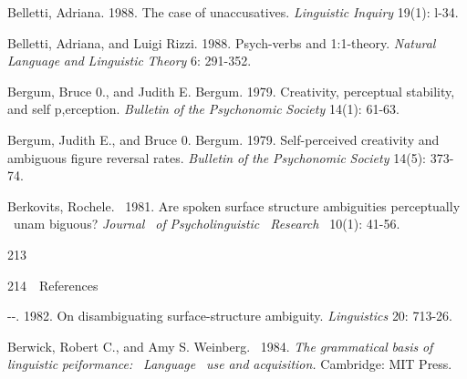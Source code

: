 \begin{styleStandard}
Belletti, Adriana. 1988. The case of unaccusatives. \textit{Linguistic}\textit{ }\textit{Inquiry}\textit{ }19(1): l{}-34.
\end{styleStandard}


\begin{styleStandard}
Belletti, Adriana, and Luigi Rizzi. 1988. Psych-verbs and 1:1-theory. \textit{Natural}\textit{ }\textit{Language}\textit{ }\textit{and}\textit{ }\textit{Linguistic}\textit{ }\textit{Theory}\textit{ }6: 291-352.
\end{styleStandard}


\begin{styleStandard}
Bergum, Bruce 0., and Judith E. Bergum. 1979. Creativity, perceptual stability, and self\- p,erception. \textit{Bulletin}\textit{ }\textit{of}\textit{ }\textit{the}\textit{ }\textit{Psychonomic}\textit{ }\textit{Society}\textit{ }14(1): 61-63.
\end{styleStandard}


\begin{styleStandard}
Bergum, Judith E., and Bruce 0. Bergum. 1979. Self-perceived creativity and ambiguous figure reversal rates. \textit{Bulletin}\textit{ }\textit{of}\textit{ }\textit{the}\textit{ }\textit{Psychonomic}\textit{ }\textit{Society}\textit{ }14(5): 373-74.
\end{styleStandard}


\begin{styleStandard}
Berkovits, Rochele. \ 1981. Are spoken surface structure ambiguities perceptually \ unam\- biguous? \textit{Journal }\textit{\ }\textit{of}\textit{ }\textit{Psycholinguistic }\textit{\ }\textit{Research }\textit{\ }10(1): 41-56.
\end{styleStandard}


\begin{styleStandard}
213
\end{styleStandard}


\clearpage\setcounter{page}{1}\begin{styleStandard}
214\ \ References
\end{styleStandard}


\begin{listWWNumxiileveli}
\item 
\begin{styleStandard}
{}-{}-. 1982. On disambiguating surface-structure ambiguity. \textit{Linguistics}\textit{ }20: 713-26.
\end{styleStandard}


\end{listWWNumxiileveli}
\begin{styleStandard}
Berwick, Robert C., and Amy S. Weinberg. \ 1984. \textit{The}\textit{ }\textit{grammatical}\textit{ }\textit{basis}\textit{ }\textit{of}\textit{ }\textit{linguistic}\textit{ }\textit{peiformance: }\textit{\ }\textit{Language }\textit{\ }\textit{use}\textit{ }\textit{and}\textit{ }\textit{acquisition.}\textit{ }Cambridge: MIT Press.
\end{styleStandard}


